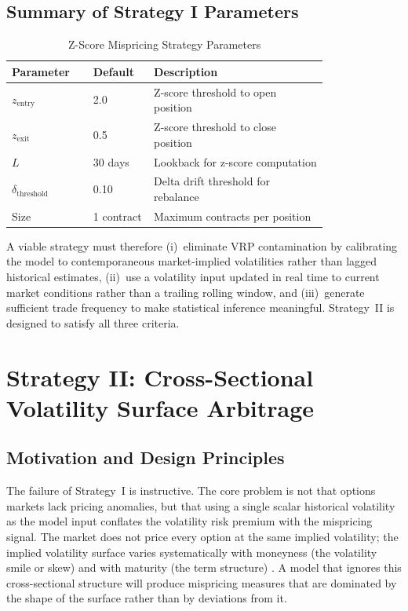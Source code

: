 \documentclass[10pt,twocolumn]{article}
\begin{document}
\subsection{Summary of Strategy I Parameters}

\begin{table}[tb]
\centering
\caption{Z-Score Mispricing Strategy Parameters}
\label{tab:params_zscore}
\small
\setlength{\tabcolsep}{4pt}
\renewcommand{\arraystretch}{1.1}
\begin{tabular}{p{0.20\linewidth} p{0.14\linewidth} p{0.46\linewidth}}
\toprule
\textbf{Parameter} & \textbf{Default} & \textbf{Description} \\
\midrule
$z_{\text{entry}}$ & 2.0 & Z-score threshold to open position \\
$z_{\text{exit}}$  & 0.5 & Z-score threshold to close position \\
$L$  & 30 days & Lookback for z-score computation \\
$\delta_{\text{threshold}}$ & 0.10 & Delta drift threshold for rebalance \\
Size & 1 contract & Maximum contracts per position \\
\bottomrule
\end{tabular}
\end{table}

A viable strategy must therefore (i)~eliminate VRP contamination by
calibrating the model to contemporaneous market-implied volatilities rather
than lagged historical estimates, (ii)~use a volatility input updated in real
time to current market conditions rather than a trailing rolling window, and
(iii)~generate sufficient trade frequency to make statistical inference
meaningful.  Strategy~II is designed to satisfy all three criteria.


\section{Strategy II: Cross-Sectional Volatility Surface Arbitrage}
\label{sec:surface_strategy}

\subsection{Motivation and Design Principles}

The failure of Strategy~I is instructive. The core problem is not that
options markets lack pricing anomalies, but that using a single scalar
historical volatility as the model input conflates the volatility risk premium
with the mispricing signal. The market does not price every option at the
same implied volatility; the implied volatility surface varies systematically
with moneyness (the volatility smile or skew) and with maturity (the term
structure) \cite{gatheral2006}. A model that ignores this cross-sectional
structure will produce mispricing measures that are dominated by the shape of
the surface rather than by deviations from it.
\end{document}
